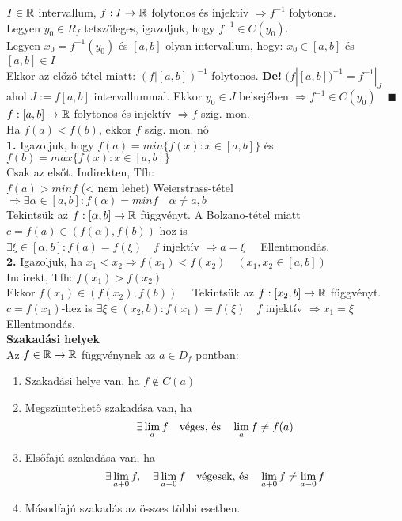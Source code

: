 \documentclass[a4paper,11pt]{article}
\begin{document}
\tetel $I\in\mathbb{R}$ intervallum, $f:I\to\mathbb{R}$ folytonos és injektív $\Rightarrow f^{-1}$ folytonos.\\[0.1cm]
\biz Legyen $y_0\in R_f$ tetszőleges, igazoljuk, hogy $f^{-1}\in C(y_0)$.\\[0.1cm]Legyen $x_0=f^{-1}(y_0)$ és $[a,b]$ olyan intervallum, hogy: $x_0\in[a,b]$ és $[a,b]\in I$\\[0.1cm]Ekkor az előző tétel miatt: $(f|[a,b])^{-1}$ folytonos. \textbf{De!} $(f|[a,b])^{-1}=f^{-1}|_J$\\[0.1cm]ahol $J:=f[a,b]$ intervallummal. Ekkor $y_0\in J$ belsejében $\Rightarrow f^{-1}\in C(y_0)\quad\blacksquare$\\[0.2cm]
\tetel $f:[a,b]\to\mathbb{R}$ folytonos és injektív $\Rightarrow f$ szig. mon.\\[0.1cm]
\biz Ha $f(a)<f(b)$, ekkor $f$ szig. mon. nő\\[0.1cm] \textbf{1.} Igazoljuk, hogy $f(a)=min\{f(x):x\in[a,b]\}$ és $f(b)=max\{f(x):x\in[a,b]\}$\\[0.1cm] Csak az elsőt. Indirekten, Tfh:\\[0.1cm] $f(a)>min f$ (< nem lehet) Weierstrass-tétel $\Rightarrow\exists\alpha\in[a,b]:f(\alpha)=min f\quad\alpha\neq a,b$\\[0.1cm] Tekintsük az $f:[\alpha,b]\to\mathbb{R}$ függvényt. A Bolzano-tétel miatt $c=f(a)\in(f(\alpha),f(b))$-hoz is\\[0.1cm] $\exists\xi\in[\alpha,b]:f(a)=f(\xi)\quad f$ injektív $\Rightarrow a=\xi\quad$ Ellentmondás.\\[0.1cm]\textbf{2.} Igazoljuk, ha $x_1<x_2\Rightarrow f(x_1)<f(x_2)\quad(x_1,x_2\in[a,b])$\\[0.1cm]Indirekt, Tfh: $f(x_1)>f(x_2)$\\[0.1cm]Ekkor $f(x_1)\in(f(x_2),f(b))\quad$ Tekintsük az $f:[x_2,b] \to\mathbb{R}$ függvényt.\\[0.1cm]$c=f(x_1)$-hez is $\exists\xi\in(x_2,b):f(x_1)=f(\xi)\quad f$ injektív $\Rightarrow x_1=\xi\quad$ Ellentmondás.\\[0.2cm]
\textbf{{\Large Szakadási helyek}}\\[0.2cm]
 Az $f\in\mathbb{R}\to\mathbb{R}$ függvénynek az $a\in D_f$ pontban:
\begin{enumerate}
	\item Szakadási helye van, ha $f\notin C(a)$
	\item Megszüntethető szakadása van, ha \[ \exists\lim_{a} f\text{\quad véges, és\quad } \lim_a f\not=f(a)\]
	\item Elsőfajú szakadása van, ha
	\[ \exists \lim_{a+0} f,\quad \exists\lim_{a-0}f \text{\quad végesek, és\quad } \lim_{a+0} f \not= \lim_{a-0}f \]
	\item Másodfajú szakadás az összes többi esetben.
\end{enumerate}
\end{document}
